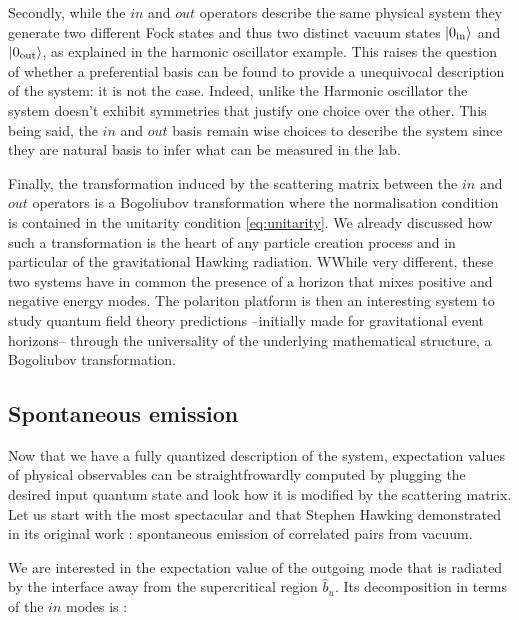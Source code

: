 \bigskip

Secondly, while the $in$ and $out$ operators describe the same physical system they generate two different Fock states and thus two distinct vacuum states $\ket{0_{\mathrm{in}}}$ and $\ket{0_{\mathrm{out}}}$, as explained in the harmonic oscillator example.
This raises the question of whether a preferential basis can be found to provide a unequivocal description of the system: it is not the case.
 Indeed, unlike the Harmonic oscillator the system doesn't exhibit symmetries that justify one choice over the other. This being said, the $in$
and $out$ basis remain wise choices to describe the system since they are natural basis to infer what can be measured in the lab.

\bigskip

Finally, the transformation induced by the scattering matrix between the $in$ and $out$ operators is a Bogoliubov transformation where the 
normalisation condition is contained in the unitarity condition \ref{eq:unitarity}. We already discussed how such a transformation is the heart 
of any particle creation process and in particular of the gravitational Hawking radiation.  
WWhile very different,  these two systems  have in common the presence of a horizon that mixes positive and negative energy modes. The polariton platform is then an interesting system to study quantum field theory predictions --initially made for gravitational event horizons-- through the universality of the underlying 
mathematical structure, a Bogoliubov transformation.

\subsection{Spontaneous emission}

\label{subsec:spontaneous_emission}

Now that we have a fully quantized description of the system, expectation values of physical observables can be straightfrowardly
computed by plugging the desired input quantum state and look how it is modified by the scattering matrix. Let us start with the most spectacular and that
Stephen Hawking demonstrated in its original work \cite{hawking_black_1972} : spontaneous emission of correlated pairs from vacuum.


We are interested in the expectation value of the outgoing mode that is radiated by the interface away from the supercritical region $\hat{b}_u$.
Its decomposition in terms of the $in$ modes is :

